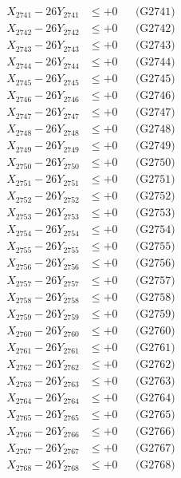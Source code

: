 \documentclass[a4paper,10pt]{article}
\begin{document}
{\begin{align}
X_{2741} - 26Y_{2741} &\leq +0 && \text{(G2741)} \\
X_{2742} - 26Y_{2742} &\leq +0 && \text{(G2742)} \\
X_{2743} - 26Y_{2743} &\leq +0 && \text{(G2743)} \\
X_{2744} - 26Y_{2744} &\leq +0 && \text{(G2744)} \\
X_{2745} - 26Y_{2745} &\leq +0 && \text{(G2745)} \\
X_{2746} - 26Y_{2746} &\leq +0 && \text{(G2746)} \\
X_{2747} - 26Y_{2747} &\leq +0 && \text{(G2747)} \\
X_{2748} - 26Y_{2748} &\leq +0 && \text{(G2748)} \\
X_{2749} - 26Y_{2749} &\leq +0 && \text{(G2749)} \\
X_{2750} - 26Y_{2750} &\leq +0 && \text{(G2750)} \\
\allowbreak
X_{2751} - 26Y_{2751} &\leq +0 && \text{(G2751)} \\
X_{2752} - 26Y_{2752} &\leq +0 && \text{(G2752)} \\
X_{2753} - 26Y_{2753} &\leq +0 && \text{(G2753)} \\
X_{2754} - 26Y_{2754} &\leq +0 && \text{(G2754)} \\
X_{2755} - 26Y_{2755} &\leq +0 && \text{(G2755)} \\
X_{2756} - 26Y_{2756} &\leq +0 && \text{(G2756)} \\
X_{2757} - 26Y_{2757} &\leq +0 && \text{(G2757)} \\
X_{2758} - 26Y_{2758} &\leq +0 && \text{(G2758)} \\
X_{2759} - 26Y_{2759} &\leq +0 && \text{(G2759)} \\
X_{2760} - 26Y_{2760} &\leq +0 && \text{(G2760)} \\
\allowbreak
X_{2761} - 26Y_{2761} &\leq +0 && \text{(G2761)} \\
X_{2762} - 26Y_{2762} &\leq +0 && \text{(G2762)} \\
X_{2763} - 26Y_{2763} &\leq +0 && \text{(G2763)} \\
X_{2764} - 26Y_{2764} &\leq +0 && \text{(G2764)} \\
X_{2765} - 26Y_{2765} &\leq +0 && \text{(G2765)} \\
X_{2766} - 26Y_{2766} &\leq +0 && \text{(G2766)} \\
X_{2767} - 26Y_{2767} &\leq +0 && \text{(G2767)} \\
X_{2768} - 26Y_{2768} &\leq +0 && \text{(G2768)} \\

\end{align}}
\end{document}
